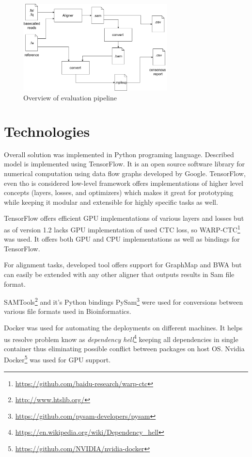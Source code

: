 \documentclass[times, utf8, diplomski, numeric, english]{fer}
\begin{document}
\begin{figure}[!ht]
	\begin{center}
		\includegraphics[width=0.7\textwidth]{./imgs/evaluation_pipeline.png}
		\caption{Overview of evaluation pipeline}
		\label{fg:eval_pipe}
	\end{center}
\end{figure}

\section{Technologies}

Overall solution was implemented in Python programing language. Described model is implemented using TensorFlow. It is an open source software library for numerical computation using data flow graphs developed by Google. TensorFlow, even tho is considered low-level framework offers implementations of higher level concepts (layers, losses, and optimizers) which makes it great for prototyping while keeping it modular and extensible for highly specific tasks as well.

TensorFlow offers efficient GPU implementations of various layers and losses but as of version 1.2 lacks GPU implementation of used CTC loss, so WARP-CTC\footnote{\url{https://github.com/baidu-research/warp-ctc}} was used. It offers both GPU and CPU implementations as well as bindings for TensorFlow.

For alignment tasks, developed tool offers support for GraphMap and BWA but can easily be extended with any other aligner that outputs results in Sam file format.

SAMTools\footnote{\url{http://www.htslib.org/}} and it's Python bindings PySam\footnote{\url{https://github.com/pysam-developers/pysam}} were used for conversions between various file formats used in Bioinformatics.

Docker was used for automating the deployments on different machines. It helps us resolve problem know as \textit{dependency hell}\footnote{\url{https://en.wikipedia.org/wiki/Dependency_hell}}  keeping all dependencies in single container thus eliminating possible conflict between packages on host OS.
Nvidia Docker\footnote{\url{https://github.com/NVIDIA/nvidia-docker}} was used for GPU support.
\end{document}
